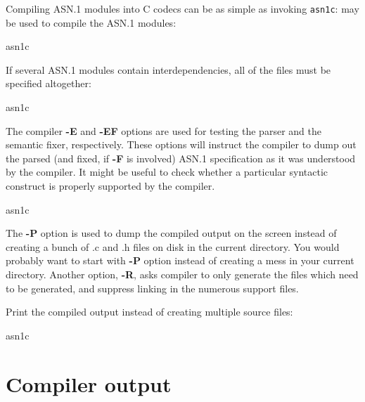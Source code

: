 \documentclass[english,oneside,12pt]{book}
\newcommand{\cmd}[1]{\texttt{#1}}
\begin{document}
Compiling ASN.1 modules into C codecs can be as simple as invoking \cmd{asn1c}:
may be used to compile the ASN.1 modules:
\begin{bash}
asn1c %
\end{bash}

If several ASN.1 modules contain interdependencies, all of the files
must be specified altogether:
\begin{bash}
asn1c %
\end{bash}
The compiler \textbf{-E} and \textbf{-EF} options are used for testing
the parser and the semantic fixer, respectively. These options will
instruct the compiler to dump out the parsed (and fixed, if \textbf{-F}
is involved) ASN.1 specification as it was understood
by the compiler. It might be useful to check whether a particular
syntactic construct is properly supported by the compiler.
\begin{bash}
asn1c %
\end{bash}
The \textbf{-P} option is used to dump the compiled output on the
screen instead of creating a bunch of .c and .h files on disk in the
current directory. You would probably want to start with \textbf{-P}
option instead of creating a mess in your current directory. Another
option, \textbf{-R}, asks compiler to only generate the files which
need to be generated, and suppress linking in the numerous support
files.

Print the compiled output instead of creating multiple source files:
\begin{bash}
asn1c %
\end{bash}

\clearpage{}
\section{Compiler output}
\end{document}
